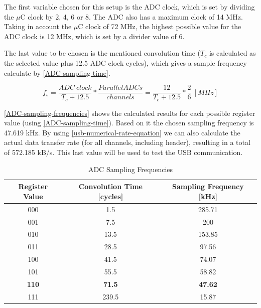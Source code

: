 The first variable chosen for this setup is the ADC clock, which is set by dividing
the $\mu$C clock by 2, 4, 6 or 8. The ADC also has a maximum clock of 14 MHz. Taking in
account the  $\mu$C clock of 72 MHz, the highest possible value for the ADC clock is 12 MHz,
which is set by a divider value of 6. 

The last value to be chosen is the mentioned convolution time ($T_{c}$ is calculated as the selected
value plus 12.5 ADC clock cycles), which gives a sample frequency calculate by \autoref{ADC-sampling-time}.

\begin{equation}
  \label{ADC-sampling-time}
  f_{s} = \frac{ADC\ clock}{T_{c} + 12.5}  * \frac{Parallel ADCs}{channels} = \frac{12}{T_{c} + 12.5}  * \frac{2}{6}\ [MHz]
\end{equation}

\autoref{ADC-sampling-frequencies} shows the calculated results for each possible
register value (using \autoref{ADC-sampling-time}). Based on it the chosen sampling
frequency is 47.619 kHz. By using \autoref{usb-numerical-rate-equation} we can also
calculate the actual data transfer rate (for all channels, including header),
resulting in a total of 572.185 kB/s. This last value will be used to test the USB communication.

\begin{table}[htb]
  \caption{ADC Sampling Frequencies}
  \label{ADC-sampling-frequencies}
  \begin{tabular}{c|c|c}
    \textbf{Register Value} & \textbf{Convolution Time [cycles]} & \textbf{Sampling Frequency [kHz]}\\
    \hline \hline
    000 & 1.5 & 285.71 \\
    \hline
    001 & 7.5 & 200 \\
    \hline
    010 & 13.5 & 153.85 \\
    \hline
    011 & 28.5 & 97.56 \\
    \hline
    100 & 41.5 & 74.07 \\
    \hline
    101 & 55.5 & 58.82 \\
    \hline
    \textbf{110} & \textbf{71.5} & \textbf{47.62} \\
    \hline
    111 & 239.5 & 15.87 \\
  \end{tabular}
\end{table}
